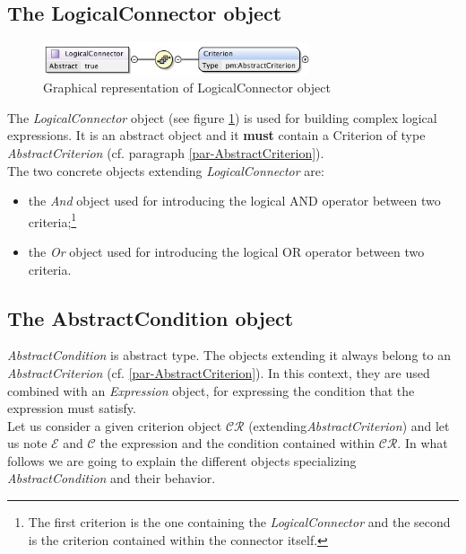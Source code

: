 \documentclass[a4paper,11pt] {ivoa}
\begin{document}
\subsection{The LogicalConnector object}\label{par-LogicalConnector}
\begin{figure}[htbp]
\begin{center}
\includegraphics[width=0.7\textwidth]{pictures/LogicalConnector.jpg} 
\caption{Graphical representation of LogicalConnector object}
\label{Pic-LogicalConnector}
\end{center}
\end{figure}
The {\it LogicalConnector} object (see figure \ref{Pic-LogicalConnector}) is used for building
complex logical expressions. It is an abstract object and it {\bf must} contain a Criterion
of type {\it AbstractCriterion} (cf. paragraph \ref{par-AbstractCriterion}).\\
The two concrete objects extending {\it LogicalConnector} are:
\begin{itemize}
\item the {\it And} object used for introducing the logical AND operator between two
criteria;\footnote{The first criterion is the one containing the {\it LogicalConnector} and the
second is the criterion contained within the connector itself.}
\item the {\it Or} object used for introducing the logical OR operator between two criteria.
\end{itemize}

\subsection{The AbstractCondition object}\label{par-ConditionType}
{\it AbstractCondition} is abstract type. The objects extending it always belong to an  {\it 
AbstractCriterion} (cf. \ref{par-AbstractCriterion}). In this context, they are used combined with
an {\it Expression} object, for expressing the condition that the expression must satisfy.\\
Let us consider a given criterion object $\mathcal{CR}$ (extending{\it AbstractCriterion})  and let
us note $\mathcal E$ and $\mathcal C$ the expression and the condition contained within
$\mathcal{CR}$.
In what follows we are going to explain the different objects specializing  {\it AbstractCondition}
and their behavior.
\end{document}
